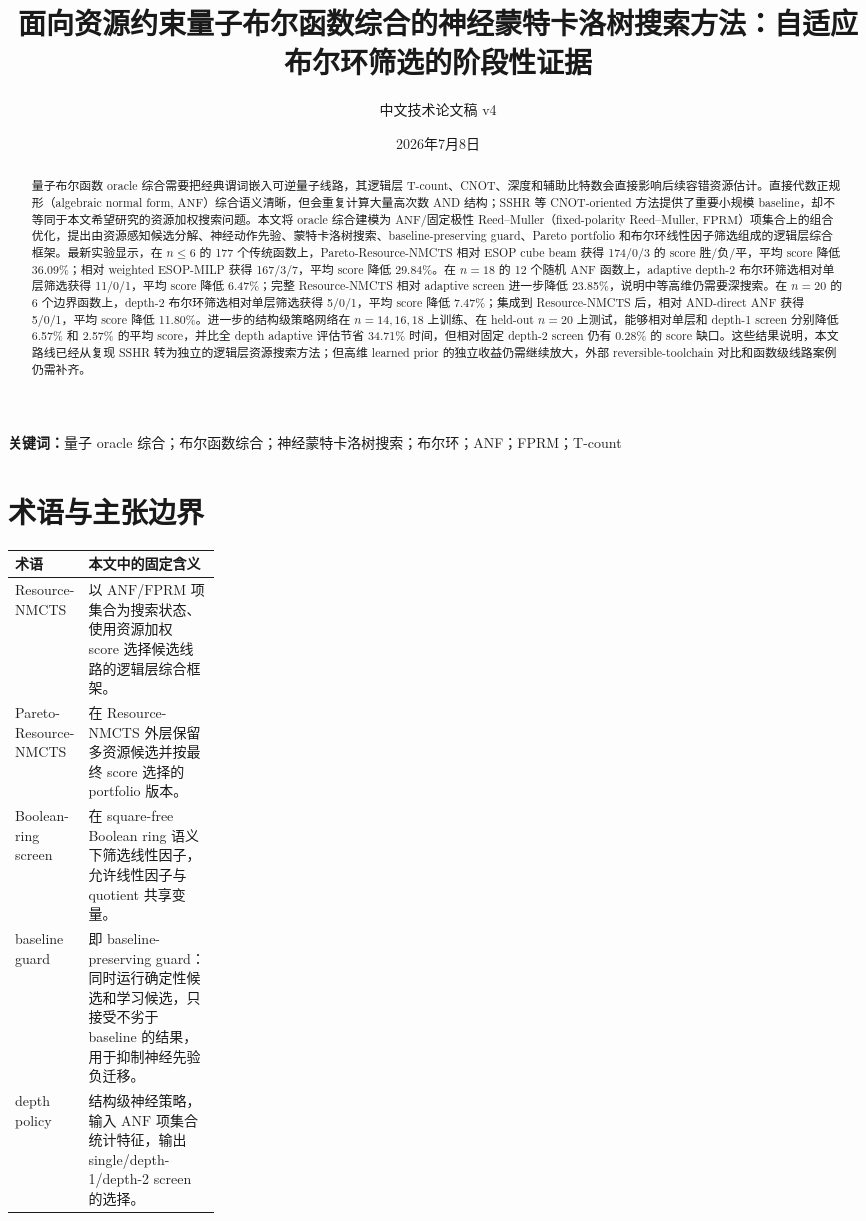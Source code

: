 \documentclass[UTF8,fontset=macnew,11pt]{ctexart}
\title{面向资源约束量子布尔函数综合的神经蒙特卡洛树搜索方法：自适应布尔环筛选的阶段性证据}
\author{中文技术论文稿 v4}
\date{2026年7月8日}
\newcommand{\method}{Resource-NMCTS}
\newcommand{\pareto}{Pareto-Resource-NMCTS}
\newcommand{\anf}{\ensuremath{\mathrm{ANF}}}
\newcommand{\fprm}{\ensuremath{\mathrm{FPRM}}}
\begin{document}
\pagestyle{plain}
\maketitle

\begin{abstract}
量子布尔函数 oracle 综合需要把经典谓词嵌入可逆量子线路，其逻辑层 T-count、CNOT、深度和辅助比特数会直接影响后续容错资源估计。直接代数正规形（algebraic normal form, \anf{}）综合语义清晰，但会重复计算大量高次数 AND 结构；SSHR 等 CNOT-oriented 方法提供了重要小规模 baseline，却不等同于本文希望研究的资源加权搜索问题。本文将 oracle 综合建模为 \anf{}/固定极性 Reed--Muller（fixed-polarity Reed--Muller, \fprm{}）项集合上的组合优化，提出由资源感知候选分解、神经动作先验、蒙特卡洛树搜索、baseline-preserving guard、Pareto portfolio 和布尔环线性因子筛选组成的逻辑层综合框架。最新实验显示，在 $n\leq6$ 的 177 个传统函数上，\pareto{} 相对 ESOP cube beam 获得 174/0/3 的 score 胜/负/平，平均 score 降低 36.09\%；相对 weighted ESOP-MILP 获得 167/3/7，平均 score 降低 29.84\%。在 $n=18$ 的 12 个随机 \anf{} 函数上，adaptive depth-2 布尔环筛选相对单层筛选获得 11/0/1，平均 score 降低 6.47\%；完整 \method{} 相对 adaptive screen 进一步降低 23.85\%，说明中等高维仍需要深搜索。在 $n=20$ 的 6 个边界函数上，depth-2 布尔环筛选相对单层筛选获得 5/0/1，平均 score 降低 7.47\%；集成到 \method{} 后，相对 AND-direct ANF 获得 5/0/1，平均 score 降低 11.80\%。进一步的结构级策略网络在 $n=14,16,18$ 上训练、在 held-out $n=20$ 上测试，能够相对单层和 depth-1 screen 分别降低 6.57\% 和 2.57\% 的平均 score，并比全 depth adaptive 评估节省 34.71\% 时间，但相对固定 depth-2 screen 仍有 0.28\% 的 score 缺口。这些结果说明，本文路线已经从复现 SSHR 转为独立的逻辑层资源搜索方法；但高维 learned prior 的独立收益仍需继续放大，外部 reversible-toolchain 对比和函数级线路案例仍需补齐。
\end{abstract}

\noindent\textbf{关键词：}量子 oracle 综合；布尔函数综合；神经蒙特卡洛树搜索；布尔环；ANF；FPRM；T-count

\section*{术语与主张边界}

\noindent\begin{tabularx}{\linewidth}{@{}>{\raggedright\arraybackslash}p{0.24\linewidth}X@{}}
\toprule
术语 & 本文中的固定含义 \\
\midrule
\method{} & 以 \anf{}/\fprm{} 项集合为搜索状态、使用资源加权 score 选择候选线路的逻辑层综合框架。 \\
\pareto{} & 在 \method{} 外层保留多资源候选并按最终 score 选择的 portfolio 版本。 \\
Boolean-ring screen & 在 square-free Boolean ring 语义下筛选线性因子，允许线性因子与 quotient 共享变量。 \\
baseline guard & 即 baseline-preserving guard：同时运行确定性候选和学习候选，只接受不劣于 baseline 的结果，用于抑制神经先验负迁移。 \\
depth policy & 结构级神经策略，输入 \anf{} 项集合统计特征，输出 single/depth-1/depth-2 screen 的选择。 \\
\bottomrule
\end{tabularx}
\end{document}

